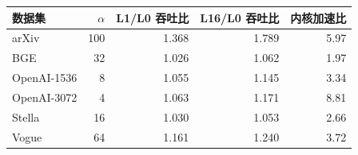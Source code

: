 \begin{tabular}{@{}lrrrr@{}}
\toprule
数据集 & $\alpha$ & L1/L0 吞吐比 & L16/L0 吞吐比 & 内核加速比 \\
\midrule
arXiv & 100 & 1.368 & 1.789 & 5.97 \\
BGE & 32 & 1.026 & 1.062 & 1.97 \\
OpenAI-1536 & 8 & 1.055 & 1.145 & 3.34 \\
OpenAI-3072 & 4 & 1.063 & 1.171 & 8.81 \\
Stella & 16 & 1.030 & 1.053 & 2.66 \\
Vogue & 64 & 1.161 & 1.240 & 3.72 \\
\bottomrule
\end{tabular}
